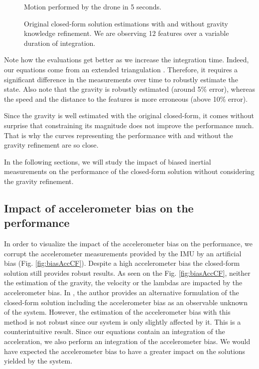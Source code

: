 \documentclass[letterpaper, 10 pt, conference]{ieeeconf}  %
\begin{document}
\begin{figure}
  \centering
    \resizebox{\columnwidth}{!}{}
    \caption{Motion performed by the drone in 5 seconds.}
\end{figure}

\begin{figure}
  \centering
    \resizebox{\columnwidth}{!}{}
    \caption{Original closed-form solution estimations with and without gravity knowledge refinement. We are observing 12 features  over a variable duration of integration.\label{fig:original}}
\end{figure}


Note how the evaluations get better as we increase the integration time.
Indeed, our equations come from an extended triangulation \cite{Martinelli2012}.
Therefore, it requires a significant difference in the measurements over time to robustly estimate the state.
Also note that the gravity is robustly estimated (around 5\% error), whereas the speed and the distance to the features is more erroneous (above 10\% error).

Since the gravity is well estimated with the original closed-form, it comes without surprise that constraining its magnitude does not improve the performance much.
That is why the curves representing the performance with and without the gravity refinement are so close.

In the following sections, we will study the impact of biased inertial measurements on the performance of the closed-form solution without considering the gravity refinement.

\subsection{Impact of accelerometer bias on the performance}
In order to visualize the impact of the accelerometer bias on the performance,
we corrupt the accelerometer measurements provided by the IMU by an artificial bias (Fig. \ref{fig:biasAccCF}).
Despite a high accelerometer bias the closed-form solution still provides robust results.
As seen on the Fig. \ref{fig:biasAccCF}, neither the estimation of the gravity, the velocity or the lambdas are impacted by the accelerometer bias.
In \cite{Martinelli2014}, the author provides an alternative formulation of the closed-form solution including the accelerometer bias as an observable unknown of the system.
However, the estimation of the accelerometer bias with this method is not robust since our system is only slightly affected by it.
This is a counterintuitive result. Since our equations contain an integration of the acceleration, we also perform an integration of the accelerometer bias.
We would have expected the accelerometer bias to have a greater impact on the solutions yielded by the system.
\end{document}
